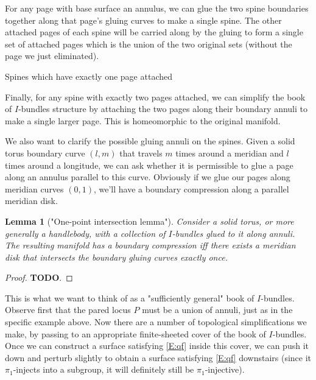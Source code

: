 \documentclass[12pt]{amsart}
\newtheorem{lemma}[theorem]{Lemma}
\theoremstyle{definition}
\theoremstyle{remark}
\begin{document}
For any page with base surface an annulus, we can glue the two spine boundaries
together along that page's gluing curves to make a single spine. The other
attached pages of each spine will be carried along by the gluing to form
a single set of attached pages which is the union of the two original sets
(without the page we just eliminated).

Spines which have exactly one page attached

Finally, for any spine with exactly two pages attached, we can simplify the
book of $I$-bundles structure by attaching the two pages along their boundary
annuli to make a single larger page. This is homeomorphic to the original
manifold.

We also want to clarify the possible gluing annuli on the spines. Given a solid
torus boundary curve $(l,m)$ that travels $m$ times around a meridian and $l$
times around a longitude, we can ask whether it is permissible to glue a page
along an annulus parallel to this curve. Obviously if we glue our pages along
meridian curves $(0,1)$, we'll have a boundary compression along a parallel
meridian disk.


\begin{lemma}["One-point intersection lemma"]

Consider a solid torus, or more generally a handlebody, with a collection of
$I$-bundles glued to it along annuli. The resulting manifold has a boundary
compression iff there exists a meridian disk that intersects the boundary
gluing curves exactly once.

\end{lemma}

\begin{proof}

\textbf{ TODO}.

\end{proof}

This is what we want to think of as a "sufficiently general" book of
$I$-bundles.  Observe first that the pared locus $P$ must be a union of annuli,
just as in the specific example above.  Now there are a number of topological
simplifications we make, by passing to an appropriate finite-sheeted cover of
the book of $I$-bundles.  Once we can construct a surface satisfying
\eqref{E:qf} inside this cover, we can push it down and perturb slightly to
obtain a surface satisfying \eqref{E:qf} downstairs (since it $\pi_1$-injects
into a subgroup, it will definitely still be $\pi_1$-injective).
\end{document}
